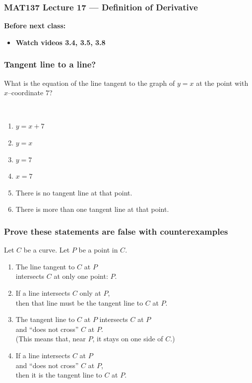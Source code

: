 \documentclass[14pt]{beamer}
\date{}
\title{}
\author{}
\newcommand {\DS} [1] {${\displaystyle #1}$}
\begin{document}


\begin{frame}
	\frametitle{MAT137 Lecture 17 --- Definition of Derivative}

	\vfill
	{\bf Before next class:}
		\begin{itemize} \normalsize
			\item {\bf Watch videos 3.4, 3.5, 3.8 }
		\end{itemize}
\end{frame}


\begin{frame}[t]
\frametitle{Tangent line to a line?}

What is the equation of the line tangent to the graph of $y=x$ at the point with $x$--coordinate $7$?

\
\begin{enumerate}
	\item \DS{y=x+7}
	\item   \DS{y=x}
	\item  \DS{y=7}
	\item  \DS{x=7}
	\item  There is no tangent line at that point.
	\item  There is more than one tangent line at that point.
\end{enumerate}

\end{frame}

\begin{frame}
\frametitle{Prove these statements are false with counterexamples}

Let  $C$ be a curve. 
Let $P$ be a point in $C$.
\vfill
\begin{enumerate}
	\item The line tangent to $C$ at $P$ \\ intersects $C$ at only one point: $P$.
\vfill
	\item  If a line intersects $C$ only at $P$, \\ then that line must be the tangent line to $C$ at $P$.
\vfill
	\item  The tangent line to $C$ at $P$ intersects $C$ at $P$ \\ and ``does not cross'' $C$ at $P$.  \\ (This means that, near $P$, it stays on one side of $C$.)
\vfill
	\item  If a line intersects $C$ at $P$ \\ and ``does not cross'' $C$ at $P$, \\ then it is the tangent line to $C$ at $P$.
\vfill
\end{enumerate}

\end{frame}
\end{document}
